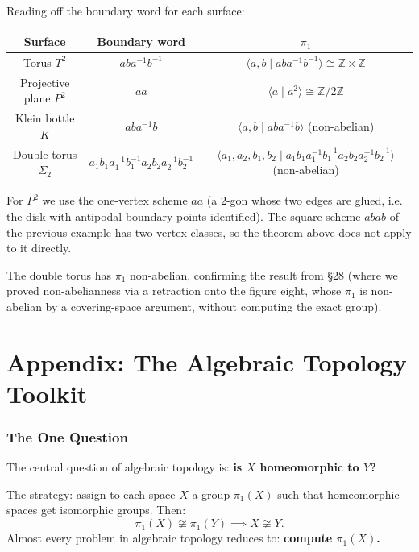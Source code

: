 \documentclass[11pt]{report}
\begin{document}
\begin{exbox}
Reading off the boundary word for each surface:
\begin{center}
\small
\begin{tabular}{|c|c|c|}
\hline
\textbf{Surface} & \textbf{Boundary word} & $\pi_1$ \\
\hline
Torus $T^2$ & $aba^{-1}b^{-1}$ & $\langle a, b \mid aba^{-1}b^{-1}\rangle \cong \mathbb{Z} \times \mathbb{Z}$ \\
\hline
Projective plane $P^2$ & $aa$ & $\langle a \mid a^2 \rangle \cong \mathbb{Z}/2\mathbb{Z}$ \\
\hline
Klein bottle $K$ & $aba^{-1}b$ & $\langle a, b \mid aba^{-1}b \rangle$ (non-abelian) \\
\hline
Double torus $\Sigma_2$ & $a_1 b_1 a_1^{-1} b_1^{-1} a_2 b_2 a_2^{-1} b_2^{-1}$ & $\langle a_1, a_2, b_1, b_2 \mid a_1 b_1 a_1^{-1} b_1^{-1} a_2 b_2 a_2^{-1} b_2^{-1} \rangle$ (non-abelian) \\
\hline
\end{tabular}
\end{center}
For $P^2$ we use the one-vertex scheme $aa$ (a $2$-gon whose two edges are glued, i.e. the disk with antipodal boundary points identified). The square scheme $abab$ of the previous example has two vertex classes, so the theorem above does not apply to it directly.

The double torus has $\pi_1$ non-abelian, confirming the result from \S 28 (where we proved non-abelianness via a retraction onto the figure eight, whose $\pi_1$ is non-abelian by a covering-space argument, without computing the exact group).
\end{exbox}

\newpage
\part*{Appendix: The Algebraic Topology Toolkit}

\section{The One Question}

The central question of algebraic topology is: \textbf{is $X$ homeomorphic to $Y$?}

The strategy: assign to each space $X$ a group $\pi_1(X)$ such that homeomorphic spaces get isomorphic groups. Then:
\[\pi_1(X) \not\cong \pi_1(Y) \implies X \not\cong Y.\]
Almost every problem in algebraic topology reduces to: \textbf{compute $\pi_1(X)$.}
\end{document}
